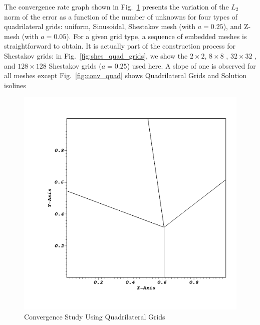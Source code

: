 \documentclass[preprint,10pt]{elsarticle}
\newcommand{\fig}[1]{Fig.~\ref{#1}}                      %
\begin{document}
The convergence rate graph shown in \fig{fig:conv_rate_quad} presents the variation of the $L_2$ norm of the error as a function
of the number of unknowns for four types of quadrilateral grids: uniform, Sinusoidal, Shestakov mesh (with $a=0.25$), and Z-mesh (with $a=0.05$).
For a given grid type, a sequence of embedded meshes is straightforward to obtain. It is actually part of the construction process for Shestakov grids:  in \fig{fig:shes_quad_grids}, we show the $2 \times 2$, $8 \times 8$ , $32 \times 32$ , and $128\times 128$  Shestakov grids ($a=0.25$) used here. 
A slope of one is observed for all meshes except  
\fig{fig:conv_quad} shows Quadrilateral Grids and Solution isolines

\begin{figure}[!hbtp]
\centering
\includegraphics[scale=0.15]{../pwld_diffusion/results/convergence/quads/shes/visit/shes-quad-0_25-msh-0000}
\caption{Convergence Study Using Quadrilateral Grids}
\label{fig:conv_rate_quad}
\end{figure}
\end{document}
